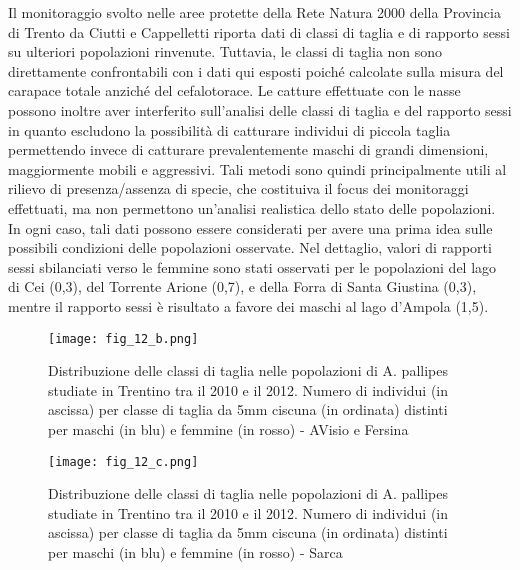 \documentclass[11pt,a4paper,italian,twoside,openany]{memoir}
\begin{document}
Il monitoraggio svolto nelle aree protette della Rete Natura 2000 della Provincia di Trento da Ciutti e Cappelletti \cite{Ciutti 2013} riporta dati di classi di taglia e di rapporto sessi su ulteriori popolazioni rinvenute. Tuttavia, le classi di taglia non sono direttamente confrontabili con i dati qui esposti poiché calcolate sulla misura del carapace totale anziché del cefalotorace. Le catture effettuate con le nasse possono inoltre aver interferito sull'analisi delle classi di taglia e del rapporto sessi in quanto escludono la possibilità di catturare individui di piccola taglia permettendo invece di catturare prevalentemente maschi di grandi dimensioni, maggiormente mobili e aggressivi. Tali metodi sono quindi principalmente utili al rilievo di presenza/assenza di specie, che costituiva il focus dei monitoraggi effettuati, ma non permettono un'analisi realistica dello stato delle popolazioni. In ogni caso, tali dati possono essere considerati per avere una prima idea sulle possibili condizioni delle popolazioni osservate. Nel dettaglio, valori di rapporti sessi sbilanciati verso le femmine sono stati osservati per le popolazioni del lago di Cei (0,3), del Torrente Arione (0,7), e della Forra di Santa Giustina (0,3), mentre il rapporto sessi è risultato a favore dei maschi al lago d'Ampola (1,5).

\begin{figure}[!h]
  \centering
    \texttt{[image: fig\_12\_b.png]}
  \caption{Distribuzione delle classi di taglia nelle popolazioni di A. pallipes studiate in Trentino tra il 2010 e il 2012. Numero di individui (in ascissa) per classe di taglia da 5mm ciscuna (in ordinata) distinti per maschi (in blu) e femmine (in rosso) - AVisio e Fersina}
  \label{fig_12_b}
\end{figure}
\begin{figure}
  \centering
    \texttt{[image: fig\_12\_c.png]}
  \caption{Distribuzione delle classi di taglia nelle popolazioni di A. pallipes studiate in Trentino tra il 2010 e il 2012. Numero di individui (in ascissa) per classe di taglia da 5mm ciscuna (in ordinata) distinti per maschi (in blu) e femmine (in rosso) - Sarca}
  \label{fig_12_c}
\end{figure}
\end{document}

